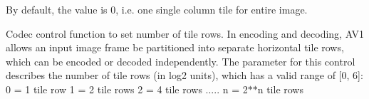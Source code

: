 \begin{Desc}
\begin{description}
By default, the value is 0, i.\+e. one single column tile for entire image. \item[{\em 
A\+V1\+E\+\_\+\+S\+E\+T\+\_\+\+T\+I\+L\+E\+\_\+\+R\+O\+WS\hypertarget{group__aom__encoder_ggae78dde67a6d78f332e9bdba0dde42db5a57f2f2a54f593b398a5e97db7982f817}{}\label{group__aom__encoder_ggae78dde67a6d78f332e9bdba0dde42db5a57f2f2a54f593b398a5e97db7982f817}
}]Codec control function to set number of tile rows. In encoding and decoding, A\+V1 allows an input image frame be partitioned into separate horizontal tile rows, which can be encoded or decoded independently. The parameter for this control describes the number of tile rows (in log2 units), which has a valid range of \mbox{[}0, 6\mbox{]}\+: 0 = 1 tile row 1 = 2 tile rows 2 = 4 tile rows ..... n = 2$\ast$$\ast$n tile rows


\end{description}
\end{Desc}
